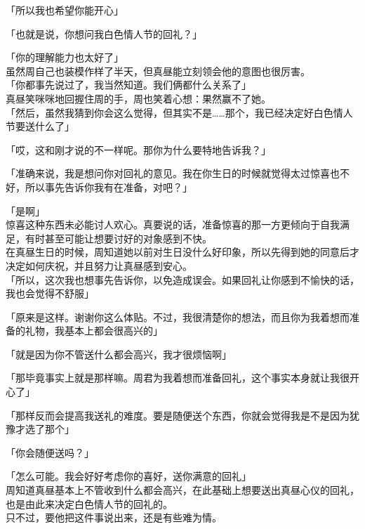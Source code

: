 「所以我也希望你能开心」

「也就是说，你想问我白色情人节的回礼？」

「你的理解能力也太好了」\\

虽然周自己也装模作样了半天，但真昼能立刻领会他的意图也很厉害。\\

「你都事先说过了，我当然知道。我们俩都什么关系了」\\

真昼笑咪咪地回握住周的手，周也笑着心想：果然赢不了她。\\

「然后，虽然我猜到你会这么觉得，但其实不是……那个，我已经决定好白色情人节要送什么了」

「哎，这和刚才说的不一样呢。那你为什么要特地告诉我？」

「准确来说，我是想问你对回礼的意见。我在你生日的时候就觉得太过惊喜也不好，所以事先告诉你我有在准备，对吧？」

「是啊」\\

惊喜这种东西未必能讨人欢心。真要说的话，准备惊喜的那一方更倾向于自我满足，有时甚至可能让想要讨好的对象感到不快。\\

在真昼生日的时候，周知道她以前对生日没什么好印象，所以先得到她的同意后才决定如何庆祝，并且努力让真昼感到安心。\\

「所以，这次我也想事先告诉你，以免造成误会。如果回礼让你感到不愉快的话，我也会觉得不舒服」

「原来是这样。谢谢你这么体贴。不过，我很清楚你的想法，而且你为我着想而准备的礼物，我基本上都会很高兴的」

「就是因为你不管送什么都会高兴，我才很烦恼啊」

「那毕竟事实上就是那样嘛。周君为我着想而准备回礼，这个事实本身就让我很开心了」

「那样反而会提高我送礼的难度。要是随便送个东西，你就会觉得我是不是因为犹豫才选了那个」

「你会随便送吗？」

「怎么可能。我会好好考虑你的喜好，送你满意的回礼」\\

周知道真昼基本上不管收到什么都会高兴，在此基础上想要送出真昼心仪的回礼，也是由此来决定白色情人节的回礼的。\\

只不过，要他把这件事说出来，还是有些难为情。\\

